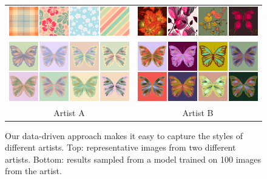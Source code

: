 \begin{figure}[ht]
\centering
\begin{tabular}{cc} 
\includegraphics[width=.44\linewidth]{figs/styleSugarExamples2}&\includegraphics[width=.44\linewidth]{figs/styleAlbenajExamples2}\vspace{1.0em}\\
\includegraphics[width=.44\linewidth]{figs/styleSugar2}&\includegraphics[width=.44\linewidth]{figs/styleAlbenaj2}\\
Artist A&Artist B\\
\end{tabular}

\caption{Our data-driven approach makes it easy to capture the styles of different artists. Top: representative images from two different artists. Bottom: results sampled from a model trained on 100 images from the artist.}
\vspace{-1.0em}
\label{fig:artistTraining}
\end{figure}

